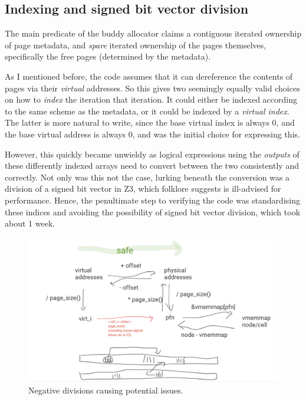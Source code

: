 \subsection{Indexing and signed bit vector division}

The main predicate of the buddy allocator claims a contiguous iterated
ownership of page metadata, and \emph{spare} iterated ownership of the pages
themselves, specifically the free pages (determined by the metadata).

As I mentioned before, the code assumes that it can dereference the contents of
pages via their \emph{virtual} addresses. So this gives two seemingly equally
valid choices on how to \emph{index} the iteration that iteration. It could
either be indexed according to the same scheme as the metadata, or it could be
indexed by a \emph{virtual index}. The latter is more natural to write, since
the base virtual index is always 0, and the base virtual address is always 0,
and was the initial choice for expressing this.

However, this quickly became unwieldy as logical expressions using the
\emph{outputs} of these differently indexed arrays need to convert between the
two consistently and correctly. Not only was this not the case, lurking beneath
the conversion was a division of a signed bit vector in Z3, which folklore
suggests is ill-advised for performance. Hence, the penultimate step to verifying the code was
standardising these indices and avoiding the possibility of signed bit vector
division, which took about 1 week.

\begin{figure}[tp]
\includegraphics{figures/buddy-negative-div.png}
\caption{Negative divisions causing potential issues.}\label{fig:buddy-negative-div}
\end{figure}

